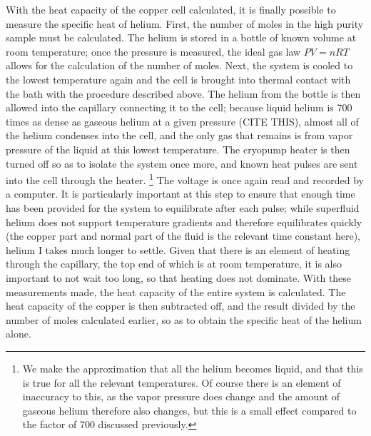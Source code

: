 With the heat capacity of the copper cell calculated, it is finally possible to measure the specific heat of helium. First, the number of moles in the high purity sample must be calculated. The helium is stored in a bottle of known volume at room temperature; once the pressure is measured, the ideal gas law $P V = n R T$ allows for the calculation of the number of moles. Next, the system is cooled to the lowest temperature again and the cell is brought into thermal contact with the bath with the procedure described above. The helium from the bottle is then allowed into the capillary connecting it to the cell; because liquid helium is 700 times as dense as gaseous helium at a given pressure (CITE THIS), almost all of the helium condenses into the cell, and the only gas that remains is from vapor pressure of the liquid at this lowest temperature. The cryopump heater is then turned off so as to isolate the system once more, and known heat pulses are sent into the cell through the heater. \footnote{We make the approximation that all the helium becomes liquid, and that this is true for all the relevant temperatures. Of course there is an element of inaccuracy to this, as the vapor pressure does change and the amount of gaseous helium therefore also changes, but this is a small effect compared to the factor of 700 discussed previously.} The voltage is once again read and recorded by a computer. It is particularly important at this step to ensure that enough time has been provided for the system to equilibrate after each pulse; while superfluid helium does not support temperature gradients and therefore equilibrates quickly (the copper part and normal part of the fluid is the relevant time constant here), helium I takes much longer to settle. Given that there is an element of heating through the capillary, the top end of which is at room temperature, it is also important to not wait too long, so that heating does not dominate.  With these measurements made, the heat capacity of the entire system is calculated. The heat capacity of the copper is then subtracted off, and the result divided by the number of moles calculated earlier, so as to obtain the specific heat of the helium alone.